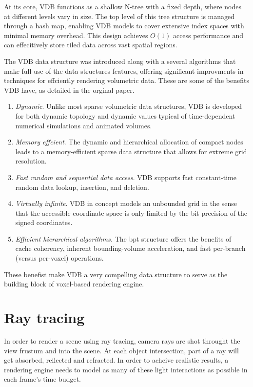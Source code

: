 At its core, VDB functions as a shallow N-tree with a fixed depth, where nodes at different levels vary in size. The top level of this tree structure is managed through a hash map, enabling VDB models to cover extensive index spaces with minimal memory overhead. This design achieves $O(1)$ access performance and can effecitively store tiled data across vast spatial regions.

The VDB data structure was introduced along with a several algorithms that make full use of the data structures features, offering significant improvments in techniques for effciently rendering volumetric data. These are some of the benefits VDB have, as detailed in the orginal paper.
\begin{enumerate}
  \item \emph{Dynamic}. Unlike most sparse volumetric data structures, VDB is developed for both dynamic topology and dynamic values typical of time-dependent numerical simulations and animated volumes.
  \item \emph{Memory effcient}. The dynamic and hierarchical allocation of compact nodes leads to a memory-efficient sparse data structure that allows for extreme grid resolution.
  \item \emph{Fast random and sequential data access}. VDB supports fast constant-time random data lookup, insertion, and deletion.
  \item \emph{Virtually infinite}. VDB in concept models an unbounded grid in the sense that the accessible coordinate space is only limited by the bit-precision of the signed coordinates.
  \item \emph{Efficient hierarchical algorithms.} The \acrshort{bpt} structure offers the benefits of cache coherency, inherent bounding-volume acceleration, and fast per-branch (versus per-voxel) operations.
\end{enumerate}
These benefist make VDB a very compelling data structure to serve as the building block of voxel-based rendering engine.

\section{Ray tracing}
In order to render a scene using ray tracing, camera rays are shot throught the view frustum and into the scene. At each object intersection, part of a ray will get absorbed, reflected and refracted. In order to acheive realistic results, a rendering engine needs to model as many of these light interactions as possible in each frame's time budget.

